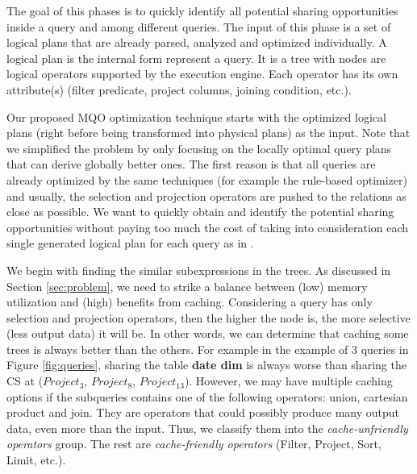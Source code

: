 The goal of this phases is to quickly identify all potential sharing opportunities inside a query and among different queries. The input of this phase is a set of logical plans that are already parsed, analyzed and optimized individually. A logical plan is the internal form represent a query. It is a tree with nodes are logical operators supported by the execution engine. Each operator has its own attribute(s) (filter predicate, project columns, joining condition, etc.). 

Our proposed MQO optimization technique starts with the optimized logical plans (right before being transformed into physical plans) as the input. Note that we simplified the problem by only focusing on the locally optimal query plans that can derive globally better ones. The first reason is that all queries are already optimized by the same techniques (for example the rule-based optimizer) and usually, the selection and projection operators are pushed to the relations as close as possible. We want to quickly obtain and identify the potential sharing opportunities without paying too much the cost of taking into consideration each single generated logical plan for each query as in \cite{zhou2007efficient}.

We begin with finding the similar subexpressions in the trees. As discussed in Section \ref{sec:problem}, we need to strike a balance between (low) memory utilization and (high) benefits from caching. Considering a query has only selection and projection operators, then the higher the node is, the more selective (less output data) it will be. In other words, we can determine that caching some trees is always better than the others. For example in the example of 3 queries in Figure \ref{fig:queries}, sharing the table \textbf{date dim} is always worse than sharing the CS at ($Project_3$, $Project_8$, $Project_{13}$). However, we may have multiple caching options if the subqueries contains one of the following operators: union, cartesian product and join. They are operators that could possibly produce many output data, even more than the input. Thus, we classify them into the \emph{cache-unfriendly operators} group. The rest are \emph{cache-friendly operators} (Filter, Project, Sort, Limit, etc.).

